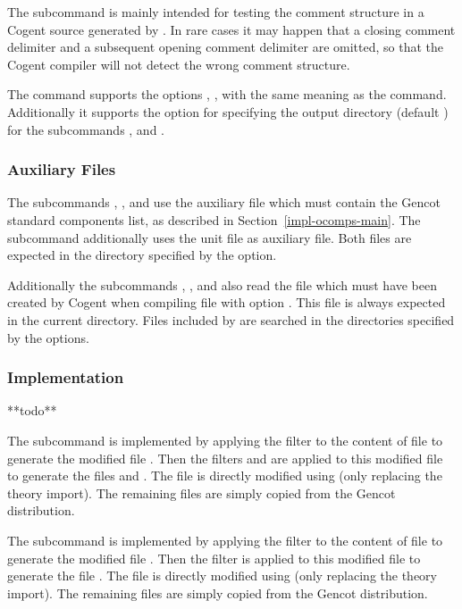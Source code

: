 The subcommand  is mainly intended for testing the comment structure in a Cogent source generated by
. In rare cases it may happen that a closing comment delimiter and a subsequent opening comment delimiter
are omitted, so that the Cogent compiler will not detect the wrong comment structure.

The  command supports the options , ,  with the same meaning as
the  command. Additionally it supports the option  for specifying the output directory (default )
for the subcommands ,  and .

\subsubsection{Auxiliary Files}

The subcommands , , and  use the auxiliary file  which must contain the Gencot
standard components list, as described in Section~\ref{impl-ocomps-main}. The subcommand  additionally uses the 
unit file  as auxiliary file. Both files are expected in the directory specified 
by the  option.

Additionally the subcommands , , and  also read 
the file  which must have been created by Cogent when compiling file  with 
option . This file is always expected in the current directory. Files included by  
are searched in the directories specified by the  options.

\subsubsection{Implementation}

**todo**

The subcommand  is implemented by applying the filter  to 
the content of file  to generate the modified file .
Then the filters  and  are applied to this modified file to generate
the files  and . 
The file  is directly modified using
 (only replacing the theory import). The remaining files are simply copied from the Gencot distribution.

The subcommand  is implemented by applying the filter  to 
the content of file  to generate the modified file . Then
the filter  is applied to this modified file to generate
the file . The file  is directly modified using
 (only replacing the theory import). The remaining files are simply copied from the Gencot distribution.

